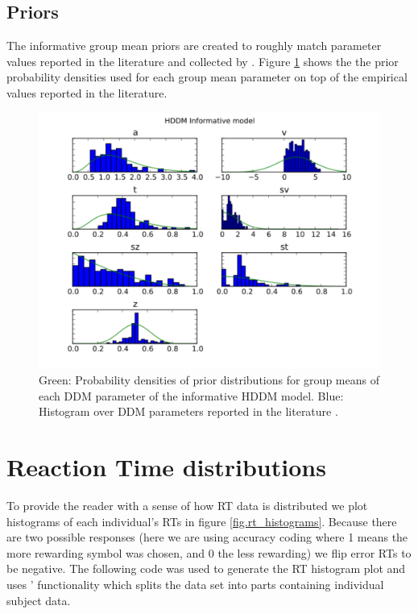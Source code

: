 \documentclass[letterpaper,10pt,english]{article}
\begin{document}
\subsection*{Priors}
The informative group mean priors are created to roughly match parameter values reported in the literature and collected by \citep{MatzkeWagenmakers09}. Figure \ref{fig.priors} shows the the prior probability densities used for each group mean parameter on top of the empirical values reported in the literature.
\begin{figure}[htbp]
\centering
\includegraphics[scale=.5]{hddm_info_priors.pdf}
\caption{Green: Probability densities of prior distributions for group means of each DDM parameter of the informative HDDM model. Blue: Histogram over DDM parameters reported in the literature \citep{MatzkeWagenmakers09}.}
\label{fig.priors}
\end{figure}

\section*{Reaction Time distributions}
To provide the reader with a sense of how RT data is distributed we plot histograms of each individual's RTs in figure \ref{fig.rt_histograms}. Because there are two possible responses (here we are using accuracy coding where 1 means the more rewarding symbol was chosen, and 0 the less rewarding) we flip error RTs to be
negative. The following code was used to generate the RT histogram plot and uses '  functionality which splits the data set into parts containing individual subject data.
\end{document}
